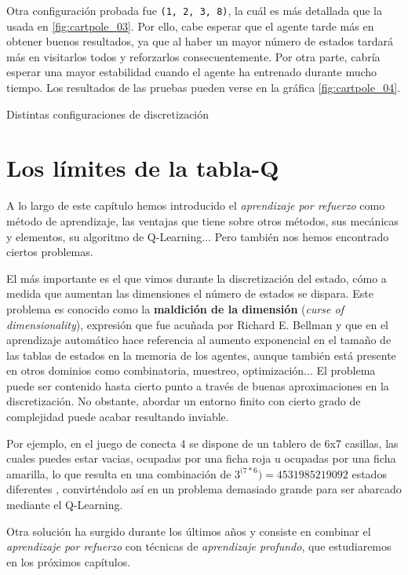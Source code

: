 Otra configuración probada fue \texttt{(1, 2, 3, 8)}, la cuál es más detallada que la usada en \ref{fig:cartpole_03}. Por ello, cabe esperar que el agente tarde más en obtener buenos resultados, ya que al haber un mayor número de estados tardará más en visitarlos todos y reforzarlos consecuentemente. Por otra parte, cabría esperar una mayor estabilidad cuando el agente ha entrenado durante mucho tiempo. Los resultados de las pruebas pueden verse en la gráfica \ref{fig:cartpole_04}.

%
       {Distintas configuraciones de discretización}


\section{Los límites de la tabla-Q}

A lo largo de este capítulo hemos introducido el \textit{aprendizaje por refuerzo} como método de aprendizaje, las ventajas que tiene sobre otros métodos, sus mecánicas y elementos, su algoritmo de Q-Learning... Pero también nos hemos encontrado ciertos problemas.

El más importante es el que vimos durante la discretización del estado, cómo a medida que aumentan las dimensiones el número de estados se dispara. Este problema es conocido como la \textbf{maldición de la dimensión} (\textit{curse of dimensionality}), expresión que fue acuñada por Richard E. Bellman \citep{bellman1957dynamic} \citep{bellman1961adaptive} y que en el aprendizaje automático hace referencia al aumento exponencial en el tamaño de las tablas de estados en la memoria de los agentes, aunque también está presente en otros dominios como combinatoria, muestreo, optimización... El problema puede ser contenido hasta cierto punto a través de buenas aproximaciones en la discretización. No obstante, abordar un entorno finito con cierto grado de complejidad puede acabar resultando inviable.

Por ejemplo, en el juego de conecta 4 se dispone de un tablero de 6x7 casillas, las cuales puedes estar vacias, ocupadas por una ficha roja u ocupadas por una ficha amarilla, lo que resulta en una combinación de $3^{(7*6}) = 4531985219092$ estados diferentes \citep{Edelkamp:2008:SCG:1433357.1433383}, convirténdolo así en un problema demasiado grande para ser abarcado mediante el Q-Learning.

Otra solución ha surgido durante los últimos años y consiste en combinar el \textit{aprendizaje por refuerzo} con técnicas de \textit{aprendizaje profundo}, que estudiaremos en los próximos capítulos.
